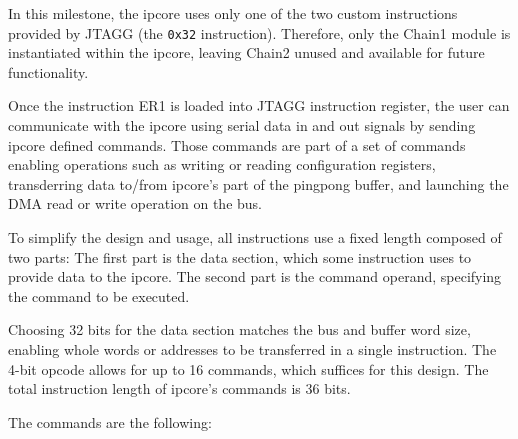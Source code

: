 \documentclass[a4paper,11pt,oneside]{report}
\begin{document}
In this milestone, the ipcore uses only one of the two custom instructions provided by JTAGG (the \texttt{0x32} instruction).  
Therefore, only the Chain1 module is instantiated within the ipcore, leaving Chain2 unused and available for future functionality.

Once the instruction ER1 is loaded into JTAGG instruction register, the user can communicate with the ipcore using serial data in and out signals by sending 
 ipcore defined commands.
Those commands are part of a set of commands enabling operations such as writing or reading configuration registers, transderring data to/from ipcore's part of the pingpong buffer,
and launching the DMA read or write operation on the bus.

To simplify the design and usage, all instructions use a fixed length composed of two parts:
The first part is the data section, which some instruction uses to provide data to the ipcore.
The second part is the command operand, specifying the command to be executed.

Choosing 32 bits for the data section matches the bus and buffer word size, enabling whole words or addresses to be transferred in a single instruction.  
The 4-bit opcode allows for up to 16 commands, which suffices for this design.
The total instruction length of ipcore's commands is 36 bits.

The commands are the following:
\end{document}
